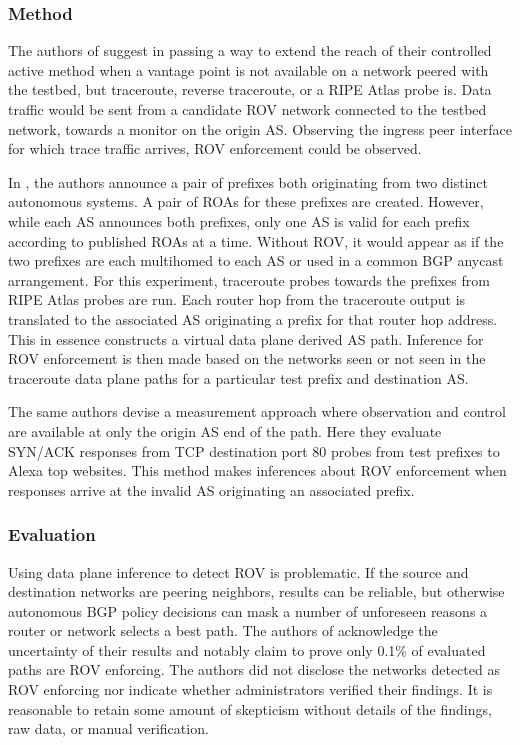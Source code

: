 \documentclass[sigconf]{acmart}
\begin{document}
\subsubsection{Method}

The authors of \cite{reuter_towards_2018} suggest in passing a way to
extend the reach of their controlled active method when a vantage point
is not available on a network peered with the testbed, but traceroute,
reverse traceroute, or a RIPE Atlas probe
is.\cite{katz-bassett_reverse_2010}\cite{ripe_ncc_staff_ripe_2015} Data
traffic would be sent from a candidate ROV network connected to the
testbed network, towards a monitor on the origin AS.  Observing the
ingress peer interface for which trace traffic arrives, ROV enforcement
could be observed.

In \cite{hlavacek_practical_2018}, the authors announce a pair of
prefixes both originating from two distinct autonomous systems.  A pair
of ROAs for these prefixes are created.  However, while each AS
announces both prefixes, only one AS is valid for each prefix according
to published ROAs at a time.  Without ROV, it would appear as if the two
prefixes are each multihomed to each AS or used in a common BGP anycast
arrangement.  For this experiment, traceroute probes towards the
prefixes from RIPE Atlas probes are run.  Each router hop from the
traceroute output is translated to the associated AS originating a
prefix for that router hop address.  This in essence constructs a
virtual data plane derived AS path.  Inference for ROV enforcement is
then made based on the networks seen or not seen in the traceroute data
plane paths for a particular test prefix and destination AS.

The same authors devise a measurement approach where observation and
control are available at only the origin AS end of the path.   Here they
evaluate SYN/ACK responses from TCP destination port 80 probes from test
prefixes to Alexa top websites.\cite{noauthor_alexa_2018}  This method
makes inferences about ROV enforcement when responses arrive at the
invalid AS originating an associated prefix.

\subsubsection{Evaluation}

Using data plane inference to detect ROV is problematic.  If the source
and destination networks are peering neighbors, results can be reliable,
but otherwise autonomous BGP policy decisions can mask a number of
unforeseen reasons a router or network selects a best path.  The authors
of \cite{hlavacek_practical_2018} acknowledge the uncertainty of their
results and notably claim to prove only 0.1\% of evaluated paths are ROV
enforcing.  The authors did not disclose the networks detected as ROV
enforcing nor indicate whether administrators verified their findings.
It is reasonable to retain some amount of skepticism without details of
the findings, raw data, or manual verification.
\end{document}
